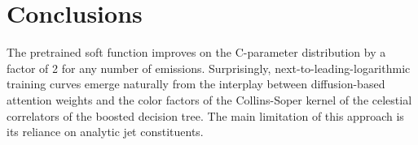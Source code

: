 \section{Conclusions}\label{sec:conclusions}

The pretrained soft function improves on the C-parameter distribution by
a factor of 2 for any number of emissions. Surprisingly,
next-to-leading-logarithmic training curves emerge naturally from the
interplay between diffusion-based attention weights and the color
factors of the Collins-Soper kernel of the celestial correlators of the
boosted decision tree. The main limitation of this approach is its
reliance on analytic jet constituents.

